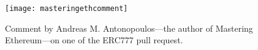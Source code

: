 \begin{figure}[!htbp]
\centering
\texttt{[image: masteringethcomment]}
\caption{Comment by Andreas M. Antonopoulos---the author of Mastering Ethereum---on one of the ERC777 pull request.}
\label{fig:masteringethcomment}
\end{figure}
